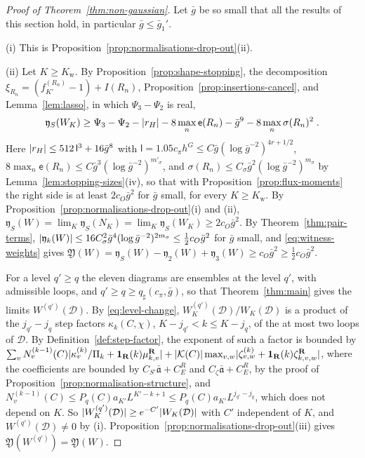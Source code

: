 \documentclass[11pt]{preprint}
\DeclarePairedDelimiter{\abs}{\lvert}{\rvert}
\numberwithin{equation}{section}
\theoremstyle{definition}
\theoremstyle{remark}
\theoremstyle{plain}
\begin{document}
\begin{proof}[Proof of Theorem~\ref{thm:non-gaussian}]
Let $\bar g$ be so small that all the results of this section hold, in particular $\bar g \leq \bar g_1'$.

(i) This is Proposition~\ref{prop:normalisations-drop-out}(ii).

(ii) Let $K \geq K_{\mathrm w}$. By Proposition~\ref{prop:shape-stopping}, the decomposition $\xi_{R_n} = (f^{(R_n)}_{K'} - 1) + I(R_n)$, Proposition~\ref{prop:insertions-cancel}, and Lemma~\ref{lem:lasso}, in which $\Psi_3 - \Psi_2$ is real,
\begin{equation}\label{eq:shape-lower}
    \mathfrak y_S(W_K) \geq \Psi_3 - \Psi_2 - \abs{r_H} - 8\max_n\mathsf e(R_n) - \bar g^9 - 8\max_n\sigma(R_n)^2\;.
\end{equation}
Here $\abs{r_H} \leq 512\,\mathsf l^3 + 16\bar g^8$ with $\mathsf l = 1.05c_\pi h^G \leq C\bar g(\log\bar g^{-2})^{4r+1/2}$, $8\max_n\mathsf e(R_n) \leq C\bar g^3(\log\bar g^{-2})^{m'_\sigma}$, and $\sigma(R_n) \leq C_\sigma\bar g^2(\log\bar g^{-2})^{m_\sigma}$ by Lemma~\ref{lem:stopping-sizes}(iv), so that with Proposition~\ref{prop:flux-moments} the right side is at least $2c_O\bar g^2$ for $\bar g$ small, for every $K \geq K_{\mathrm w}$. By Proposition~\ref{prop:normalisations-drop-out}(i) and (ii), $\mathfrak y_S(W) = \lim_K\mathfrak y_S(N_K) = \lim_K\mathfrak y_S(W_K) \geq 2c_O\bar g^2$. By Theorem~\ref{thm:pair-terms}, $\abs{\mathfrak y_k(W)} \leq 16C_\sigma^2\bar g^4(\log\bar g^{-2})^{2m_\sigma} \leq \frac12c_O\bar g^2$ for $\bar g$ small, and \eqref{eq:witness-weights} gives $\mathfrak Y(W) = \mathfrak y_S(W) - \mathfrak y_2(W) + \mathfrak y_3(W) \geq c_O\bar g^2 \geq \frac12c_O\bar g^2$.

For a level $q' \geq q$ the eleven diagrams are ensembles at the level $q'$, with admissible loops, and $q' \geq q \geq q_\sharp(c_\pi, \bar g)$, so that Theorem~\ref{thm:main} gives the limits $W^{(q')}(\mathcal D)$. By \eqref{eq:level-change}, $W^{(q')}_K(\mathcal D)/W_K(\mathcal D)$ is a product of the $j_{q'} - j_q$ step factors $\kappa_k(C, \chi)$, $K - j_{q'} < k \leq K - j_q$, of the at most two loops of $\mathcal D$. By Definition~\ref{def:step-factor}, the exponent of such a factor is bounded by $\sum_vN^{(k-1)}_v(C)\abs{\kappa^{(k)}_v/\Pi_k + \mathbf 1_{\mathbf R}(k)\mu^{\mathbf R}_{k,v}} + \abs{\mathcal K(C)}\max_{v,w}\abs{\zeta^{(k)}_{v,w} + \mathbf 1_{\mathbf R}(k)\zeta^{\mathbf R}_{k,v,w}}$, where the coefficients are bounded by $C_{S'}\bar{\mathfrak a} + C^R_E$ and $C_\zeta\bar{\mathfrak a} + C^R_E$, by the proof of Proposition~\ref{prop:normalisation-structure}, and $N^{(k-1)}_v(C) \leq P_q(C)a_{K'}L^{K'-k+1} \leq P_q(C)a_{K'}L^{j_{q'}-j_q}$, which does not depend on $K$. So $\abs{W^{(q')}_K(\mathcal D)} \geq e^{-C'}\abs{W_K(\mathcal D)}$ with $C'$ independent of $K$, and $W^{(q')}(\mathcal D) \neq 0$ by (i). Proposition~\ref{prop:normalisations-drop-out}(iii) gives $\mathfrak Y(W^{(q')}) = \mathfrak Y(W)$.


\end{proof}
\end{document}
